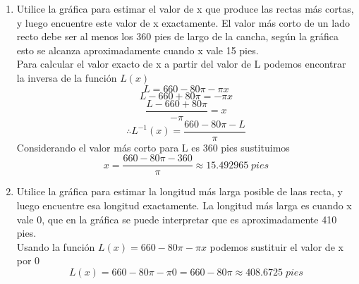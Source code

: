 \documentclass[12pt]{article}
\begin{document}
\begin{enumerate}[label=\alph*)]
\item Utilice la gráfica para estimar el valor de x que produce
las rectas más cortas, y luego encuentre este valor de x
exactamente.
El valor más corto de un lado recto debe ser al menos los 360 pies de largo de la cancha, según la gráfica esto se alcanza aproximadamente cuando x vale 15 pies.\\
Para calcular el valor exacto de x a partir del valor de L podemos encontrar la inversa de la función $L(x)$
\[
 L =  660-80 \pi -\pi x 
\]
\[
 L -660 + 80 \pi = -\pi x 
\]
\[
 \frac{L -660 + 80 \pi}{-\pi}  = x 
\]
\[
\therefore L^{-1}(x) = \frac{660-80\pi-L}{\pi} 
\]
Considerando el valor más corto para L es 360 pies sustituimos
\[
x= \frac{660-80\pi-360}{\pi} \approx 15.492965  \; pies 
\]
\item Utilice la gráfica para estimar la longitud más larga posible de laas recta, y luego encuentre esa longitud exactamente.
La longitud más larga es cuando x vale 0, que en la gráfica se puede interpretar que es aproximadamente 410 pies.\\
Usando la función $L(x) =  660-80 \pi -\pi x$ podemos sustituir el valor de x por 0
\[
L(x) =  660-80 \pi -\pi 0 = 660-80 \pi \approx408.6725 \; pies
\]
\end{enumerate}
\end{document}
